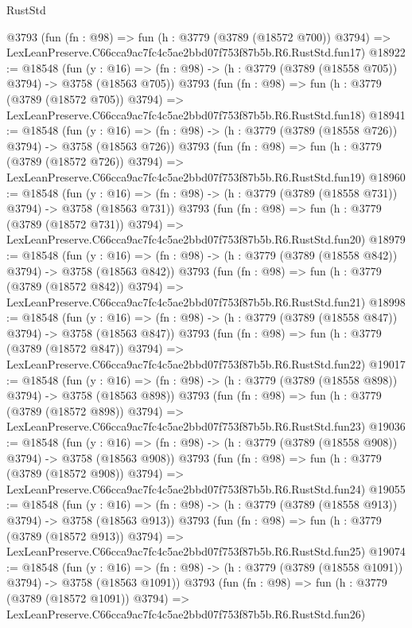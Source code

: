 \begin{lexlean}{RustStd}
\begin{coremodule}
    @3793
    (fun (fn : @98) =>
    fun (h : @3779 (@3789 (@18572 @700)) @3794) =>
    LexLeanPreserve.C66cca9ac7fc4c5ae2bbd07f753f87b5b.R6.RustStd.fun17)
@18922 := @18548
    (fun (y : @16) => (fn : @98) -> (h : @3779 (@3789 (@18558 @705)) @3794) -> @3758 (@18563 @705))
    @3793
    (fun (fn : @98) =>
    fun (h : @3779 (@3789 (@18572 @705)) @3794) =>
    LexLeanPreserve.C66cca9ac7fc4c5ae2bbd07f753f87b5b.R6.RustStd.fun18)
@18941 := @18548
    (fun (y : @16) => (fn : @98) -> (h : @3779 (@3789 (@18558 @726)) @3794) -> @3758 (@18563 @726))
    @3793
    (fun (fn : @98) =>
    fun (h : @3779 (@3789 (@18572 @726)) @3794) =>
    LexLeanPreserve.C66cca9ac7fc4c5ae2bbd07f753f87b5b.R6.RustStd.fun19)
@18960 := @18548
    (fun (y : @16) => (fn : @98) -> (h : @3779 (@3789 (@18558 @731)) @3794) -> @3758 (@18563 @731))
    @3793
    (fun (fn : @98) =>
    fun (h : @3779 (@3789 (@18572 @731)) @3794) =>
    LexLeanPreserve.C66cca9ac7fc4c5ae2bbd07f753f87b5b.R6.RustStd.fun20)
@18979 := @18548
    (fun (y : @16) => (fn : @98) -> (h : @3779 (@3789 (@18558 @842)) @3794) -> @3758 (@18563 @842))
    @3793
    (fun (fn : @98) =>
    fun (h : @3779 (@3789 (@18572 @842)) @3794) =>
    LexLeanPreserve.C66cca9ac7fc4c5ae2bbd07f753f87b5b.R6.RustStd.fun21)
@18998 := @18548
    (fun (y : @16) => (fn : @98) -> (h : @3779 (@3789 (@18558 @847)) @3794) -> @3758 (@18563 @847))
    @3793
    (fun (fn : @98) =>
    fun (h : @3779 (@3789 (@18572 @847)) @3794) =>
    LexLeanPreserve.C66cca9ac7fc4c5ae2bbd07f753f87b5b.R6.RustStd.fun22)
@19017 := @18548
    (fun (y : @16) => (fn : @98) -> (h : @3779 (@3789 (@18558 @898)) @3794) -> @3758 (@18563 @898))
    @3793
    (fun (fn : @98) =>
    fun (h : @3779 (@3789 (@18572 @898)) @3794) =>
    LexLeanPreserve.C66cca9ac7fc4c5ae2bbd07f753f87b5b.R6.RustStd.fun23)
@19036 := @18548
    (fun (y : @16) => (fn : @98) -> (h : @3779 (@3789 (@18558 @908)) @3794) -> @3758 (@18563 @908))
    @3793
    (fun (fn : @98) =>
    fun (h : @3779 (@3789 (@18572 @908)) @3794) =>
    LexLeanPreserve.C66cca9ac7fc4c5ae2bbd07f753f87b5b.R6.RustStd.fun24)
@19055 := @18548
    (fun (y : @16) => (fn : @98) -> (h : @3779 (@3789 (@18558 @913)) @3794) -> @3758 (@18563 @913))
    @3793
    (fun (fn : @98) =>
    fun (h : @3779 (@3789 (@18572 @913)) @3794) =>
    LexLeanPreserve.C66cca9ac7fc4c5ae2bbd07f753f87b5b.R6.RustStd.fun25)
@19074 := @18548
    (fun (y : @16) =>
    (fn : @98) -> (h : @3779 (@3789 (@18558 @1091)) @3794) -> @3758 (@18563 @1091))
    @3793
    (fun (fn : @98) =>
    fun (h : @3779 (@3789 (@18572 @1091)) @3794) =>
    LexLeanPreserve.C66cca9ac7fc4c5ae2bbd07f753f87b5b.R6.RustStd.fun26)

\end{coremodule}
\end{lexlean}
